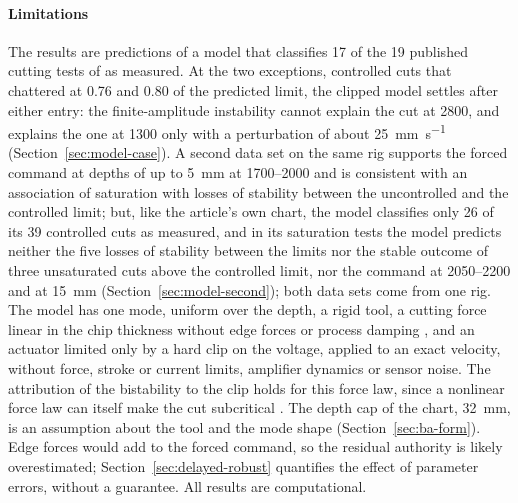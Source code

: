 \paragraph{Limitations}
The results are predictions of a model that classifies 17 of the 19 published cutting tests of \citet{ozsoy2026robust} as measured. At the two exceptions, controlled cuts that chattered at 0.76 and 0.80 of the predicted limit, the clipped model settles after either entry: the finite-amplitude instability cannot explain the cut at \SI{2800}{\rpm}, and explains the one at \SI{1300}{\rpm} only with a perturbation of about \SI{25}{\milli\metre\per\second} (Section~\ref{sec:model-case}). A second data set on the same rig \citep{ozsoy2025frequency} supports the forced command at depths of up to \SI{5}{\milli\metre} at 1700--\SI{2000}{\rpm} and is consistent with an association of saturation with losses of stability between the uncontrolled and the controlled limit; but, like the article's own chart, the model classifies only 26 of its 39 controlled cuts as measured, and in its saturation tests the model predicts neither the five losses of stability between the limits nor the stable outcome of three unsaturated cuts above the controlled limit, nor the command at 2050--\SI{2200}{\rpm} and at \SI{15}{\milli\metre} (Section~\ref{sec:model-second}); both data sets come from one rig. The model has one mode, uniform over the depth, a rigid tool, a cutting force linear in the chip thickness without edge forces or process damping \citep{altintas2012book,budak2010process}, and an actuator limited only by a hard clip on the voltage, applied to an exact velocity, without force, stroke or current limits, amplifier dynamics or sensor noise. The attribution of the bistability to the clip holds for this force law, since a nonlinear force law can itself make the cut subcritical \citep{kalmarnagy2001subcritical,dombovari2008estimates}. The depth cap of the chart, \SI{32}{\milli\metre}, is an assumption about the tool and the mode shape (Section~\ref{sec:ba-form}). Edge forces would add to the forced command, so the residual authority is likely overestimated; Section~\ref{sec:delayed-robust} quantifies the effect of parameter errors, without a guarantee. All results are computational.

